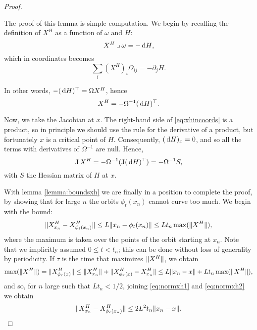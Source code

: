 \begin{proof}
\begin{lemmaproof}
The proof of this lemma is simple computation. We begin by recalling the definition of $X^H$ as a function of $\omega$ and $H$:
\begin{equation}
X^H \into \omega = - \dl H,
\end{equation}
which in coordinates becomes
\begin{equation}
\sum_i (X^H)_i \Omega_{ij} = - \partial_j H.
\end{equation}

In other words, $- (\dl H)^\transposed = \Omega X^H$, hence
\begin{equation}\label{eq:xhincoords}
X^H = - \Omega^{-1} (\dl H)^\transposed.
\end{equation}

Now, we take the Jacobian at $x$. The right-hand side of \eqref{eq:xhincoords} is a product, so in principle we should use the rule for the derivative of a product, but fortunately $x$ is a critical point of $H$. Consequently, $(\dl H)_x = 0$, and so all the terms with derivatives of $\Omega^{-1}$ are null. Hence,
\begin{equation}
\jacobian X^H = - \Omega^{-1} (\jacobian (\dl H)^\transposed) = - \Omega^{-1} S,
\end{equation}
with $S$ the Hessian matrix of $H$ at $x$.
\end{lemmaproof}

With lemma \ref{lemma:boundsxh} we are finally in a position to complete the proof, by showing that for large $n$ the orbits $\phi_t(x_n)$ cannot curve too much. We begin with the bound:
\begin{equation}\label{eq:normxh1}
\lVert X^H_{x_n} - X^H_{\phi_t(x_n)}\rVert \leq L \lVert x_n - \phi_t(x_n)\rVert \leq L t_n \max(\lVert X^H\rVert),
\end{equation}
where the maximum is taken over the points of the orbit starting at $x_n$. Note that we implicitly assumed $0 \leq t < t_n$; this can be done without loss of generality by periodicity. If $\tau$ is the time that maximizes $\lVert X^H\rVert$, we obtain
\begin{equation}\label{eq:normxh2}
\max(\lVert X^H\rVert) = \lVert X^H_{\phi_\tau(x)}\rVert \leq \lVert X^H_{x_n}\rVert + \lVert X^H_{\phi_\tau(x)} - X^H_{x_n}\rVert \leq L \lVert x_n - x\rVert + L t_n \max(\lVert X^H\rVert),
\end{equation}
and so, for $n$ large such that $L t_n < 1/2$, joining \eqref{eq:normxh1} and \eqref{eq:normxh2} we obtain
\begin{equation}
\lVert X^H_{x_n} - X^H_{\phi_t(x_n)}\rVert \leq 2 L^2 t_n \lVert x_n - x\rVert.
\end{equation}


\end{proof}
